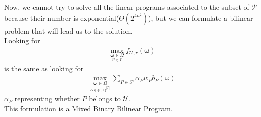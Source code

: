 Now, we cannot try to solve all the linear programs associated to the subset of $\mathcal{P}$ because their number is exponential($\Theta(2^{4n^{2}})$), but we can formulate a bilinear problem that will lead us to the solution.\\
Looking for
\begin{align} \max \limits_{\underset{\mathcal{U} \subset P}{\mathbf{\omega} \in \Omega}} f_{\mathcal{U},r} (\mathbf{\omega}) \end{align}
is the same as looking for
\begin{align} \max \limits_{\underset{\mathbf{\alpha} \in \{0,1\}^{|\mathcal{P}|}}{\mathbf{\omega} \in \Omega}} \sum_{P \in \mathcal{P}} \alpha_P w_P b_P(\omega) \end{align}
$\alpha_P$ representing whether $P$ belongs to $\mathcal{U}$.\\
This formulation is a Mixed Binary Bilinear Program.